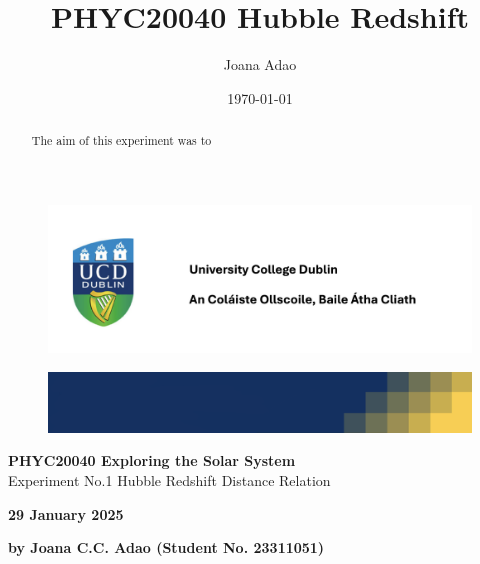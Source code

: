 \documentclass[11pt]{article}
\title{PHYC20040 Hubble Redshift}
\author{Joana Adao}
\date{\today}
\begin{document}
\begin{titlepage}
    \begin{center}

        \begin{figure}[ht]
            \includegraphics[width=\textwidth]{UCDLogo.png}
        \end{figure}
        
        \begin{figure}
            \centerline{\includegraphics[width=\paperwidth]{UCDBanner.png}}
        \end{figure}

        \vspace{4cm}

        {\huge \bfseries PHYC20040 Exploring the Solar System}\\
        \vspace{0.75cm}
        {\LARGE Experiment No.1 Hubble Redshift Distance Relation}
        
        \vspace{1cm}
    
    {\Large \textbf{29 January 2025}}

    \vspace{2cm}
    
    {\large \textbf{by Joana C.C. Adao (Student No. 23311051)}}\\
    

    \end{center}
    
   \clearpage

\end{titlepage}

\setcounter{page}{1}
\tableofcontents

\newpage

\begin{abstract}

The aim of this experiment was to



\end{abstract}
\end{document}
